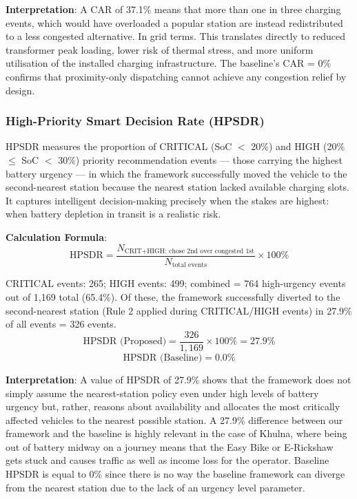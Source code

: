 \documentclass[conference]{IEEEtran}
\begin{document}
\textbf{Interpretation}: A CAR of 37.1\% means that more than one in
three charging events, which would have overloaded a popular station are
instead redistributed to a less congested alternative. In grid terms.
This translates directly to reduced transformer peak loading, lower risk
of thermal stress, and more uniform utilisation of the installed
charging infrastructure. The baseline's CAR = 0\% confirms that
proximity-only dispatching cannot achieve any congestion relief by
design.

\subsubsection{High-Priority Smart Decision Rate (HPSDR)}
 HPSDR measures the proportion of CRITICAL
(SoC $<$ 20\%) and HIGH (20\% $\leq$ SoC $<$ 30\%) priority
recommendation events --- those carrying the highest battery urgency ---
in which the framework successfully moved the vehicle to the
second-nearest station because the nearest station lacked available
charging slots. It captures intelligent decision-making precisely when
the stakes are highest: when battery depletion in transit is a realistic
risk.

\textbf{Calculation Formula}:
\begin{equation}
  \text{HPSDR} =
    \frac{N_{\text{CRIT+HIGH: chose 2nd over congested 1st}}}
         {N_{\text{total events}}}
    \times 100\%
  \label{eq:hpsdr}
\end{equation}

CRITICAL events: 265; HIGH events: 499; combined = 764 high-urgency
events out of 1,169 total (65.4\%). Of these, the framework
successfully diverted to the second-nearest station (Rule 2 applied
during CRITICAL/HIGH events) in 27.9\% of all events = 326 events.
\begin{equation}
  \text{HPSDR (Proposed)} = \frac{326}{1{,}169} \times 100\% = 27.9\%
  \label{eq:hpsdr_prop}
\end{equation}
\begin{equation}
  \text{HPSDR (Baseline)} = 0.0\%
  \label{eq:hpsdr_base}
\end{equation}

\textbf{Interpretation}: A value of HPSDR of 27.9\% shows that the
framework does not simply assume the nearest-station policy
even under high levels of battery urgency but, rather,
reasons about availability and allocates the most critically
affected vehicles to the nearest possible station. A 27.9\%
difference between our framework and the baseline is highly
relevant in the case of Khulna, where being out of battery
midway on a journey means that the Easy Bike or E-Rickshaw
gets stuck and causes traffic as well as income loss for
the operator. Baseline HPSDR is equal to 0\% since there is
no way the baseline framework can diverge from the nearest
station due to the lack of an urgency level parameter.
\end{document}
